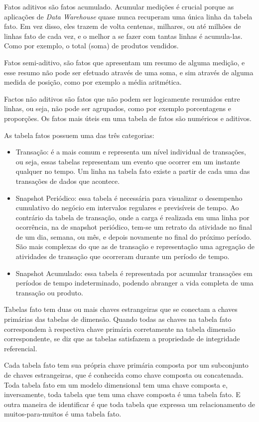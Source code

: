 Fatos aditivos são fatos acumulado. Acumular medições é crucial porque as aplicações de \textit{Data Warehouse} quase nunca recuperam uma única linha da tabela fato. Em vez disso, eles trazem de volta centenas, milhares, ou até milhões de linhas fato de cada vez, e o melhor a se fazer com tantas linhas é acumula-las. Como por exemplo, o total (soma) de produtos vendidos.

Fatos semi-aditivo, são fatos que apresentam um resumo de alguma medição, e esse resumo não pode ser efetuado através de uma soma, e sim através de alguma medida de posição, como por exemplo a média aritmética.

Factos não aditivos são fatos que não podem ser logicamente resumidos entre linhas, ou seja, não pode ser agrupados, como por exemplo porcentagens e proporções. Os fatos mais úteis em uma tabela de fatos são numéricos e aditivos.

As tabela fatos possuem uma das três categorias:
\begin{itemize}
	\item Transação: é a mais comum e representa um nível individual de transações, ou seja, essas tabelas representam um evento que ocorrer em um instante qualquer no tempo. Um linha na tabela fato existe a partir de cada uma das transações de dados que acontece.
	\item Snapshot Periódico: essa tabela é necessária para visualizar o desempenho cumulativo do negócio em intervalos regulares e previsíveis de tempo. Ao contrário da tabela de transação, onde a carga é realizada em uma linha por ocorrência, na de snapshot periódico, tem-se um retrato da atividade no final de um dia, semana, ou mês, e depois novamente no final do próximo período. São mais complexas do que as de transação e representação uma agregação de atividades de transação que ocorreram durante um período de tempo.
	\item Snapshot Acumulado: essa tabela é representada por acumular transações em períodos de tempo indeterminado, podendo abranger a vida completa de uma transação ou produto.

\end{itemize}
Tabelas fato tem duas ou mais chaves estrangeiras que se conectam a chaves primárias das tabelas de dimensão. Quando todas as chaves na tabela fato correspondem à respectiva chave primária corretamente na tabela dimensão correspondente, se diz que as tabelas satisfazem a propriedade de integridade referencial.

Cada tabela fato tem sua própria chave primária composta por um subconjunto de chaves estrangeiras, que é conhecida como chave composta ou concatenada. Toda tabela fato em um modelo dimensional tem uma chave composta e, inversamente, toda tabela que tem uma chave composta é uma tabela fato. E outra maneira de identificar é que toda tabela que expressa um relacionamento de muitos-para-muitos é uma tabela fato.

